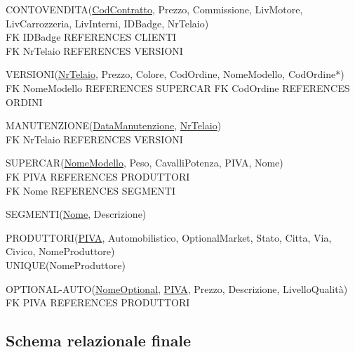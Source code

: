 \documentclass[11pt]{article}
\begin{document}
\begin{flushleft}
CONTOVENDITA(\underline{CodContratto}, Prezzo, Commissione, LivMotore,
LivCarrozzeria, LivInterni, IDBadge, NrTelaio)\\
FK IDBadge REFERENCES CLIENTI\\
FK NrTelaio REFERENCES VERSIONI
\end{flushleft}

\begin{flushleft}
VERSIONI(\underline{NrTelaio}, Prezzo, Colore, CodOrdine, NomeModello, CodOrdine*)\\
FK NomeModello REFERENCES SUPERCAR
FK CodOrdine REFERENCES ORDINI
\end{flushleft}

\begin{flushleft}
MANUTENZIONE(\underline{DataManutenzione}, \underline{NrTelaio})\\
FK NrTelaio REFERENCES VERSIONI
\end{flushleft}

\begin{flushleft}
SUPERCAR(\underline{NomeModello}, Peso, CavalliPotenza, PIVA, Nome)\\
FK PIVA REFERENCES PRODUTTORI\\
FK Nome REFERENCES SEGMENTI
\end{flushleft}

\begin{flushleft}
SEGMENTI(\underline{Nome}, Descrizione)
\end{flushleft}

\begin{flushleft}
PRODUTTORI(\underline{PIVA}, Automobilistico, OptionalMarket, Stato, Citta, Via,
Civico, NomeProduttore)\\
UNIQUE(NomeProduttore)
\end{flushleft}

\begin{flushleft}
OPTIONAL-AUTO(\underline{NomeOptional}, \underline{PIVA}, Prezzo, Descrizione,
LivelloQualità)\\
FK PIVA REFERENCES PRODUTTORI
\end{flushleft}

\normalsize

\newpage 

\subsection{Schema relazionale finale}
\end{document}
